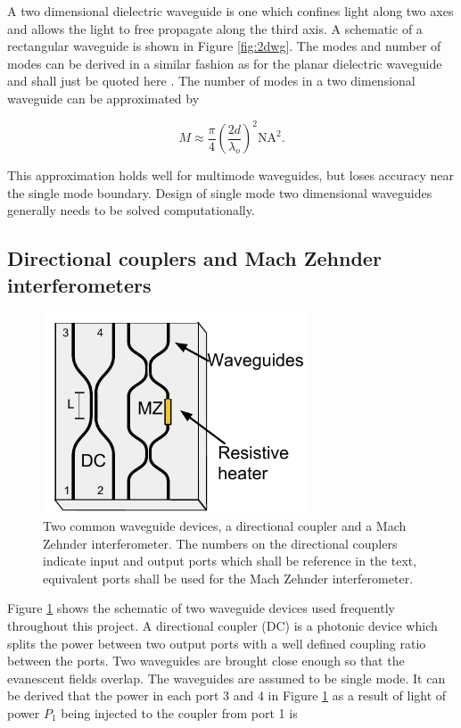 A two dimensional dielectric waveguide is one which confines light along two
axes and allows the light to free  propagate along the third axis. A schematic
of a rectangular waveguide is shown in Figure \ref{fig:2dwg}. The modes and
number of modes can be derived in a similar fashion as for the planar dielectric
waveguide and shall just be quoted here \cite{saleh1991fundamentals}. The number
of modes in a two dimensional waveguide can be approximated by

\begin{equation} M \approx \frac{\pi}{4} \left( \frac{2d}{\lambda_o } \right)^2
\mathrm{NA}^2. \end{equation}

This approximation holds well for multimode waveguides, but loses accuracy near
the single mode boundary. Design of single mode two dimensional waveguides
generally needs to be solved computationally.

\subsection{Directional couplers and Mach Zehnder interferometers}

\begin{figure}[h!] \begin{center}
\includegraphics[width=0.7\textwidth]{images/wg_devices.pdf} \end{center}
\caption{Two common waveguide devices, a directional coupler and a Mach Zehnder
interferometer. The numbers on the directional couplers indicate input and
output ports which shall be reference in the text, equivalent ports shall be
used for the Mach Zehnder interferometer.} \label{fig:wg_devices} \end{figure}

Figure \ref{fig:wg_devices} shows the schematic of two waveguide devices used
frequently throughout this project. A directional coupler (DC) is a photonic
device which splits the power between two output ports with a well defined
coupling ratio between the ports. Two waveguides are brought close enough so
that the evanescent fields overlap. The waveguides are assumed to be single
mode. It can be derived that the power in each port 3 and 4 in Figure
\ref{fig:wg_devices} as a result of light of power $P_1$ being injected to the
coupler from port 1 is

